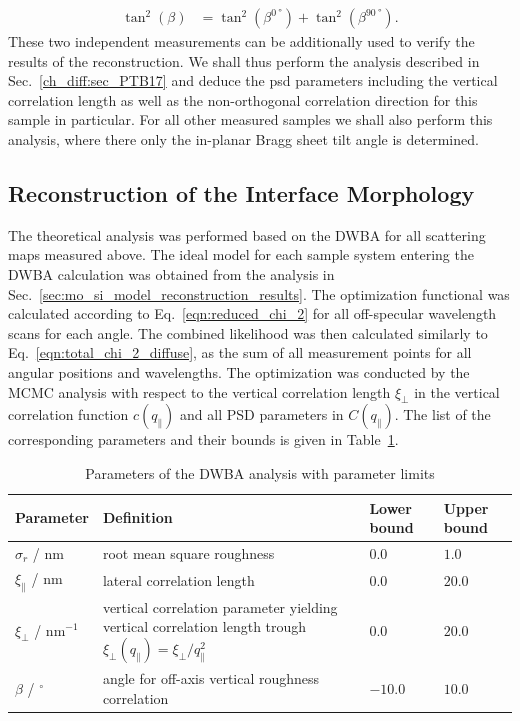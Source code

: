 \begin{align}
 \tan^2(\beta) &= \tan^2(\beta^{\SI{0}{\degree}}) + \tan^2(\beta^{\SI{90}{\degree}}) \text{.}
\end{align}
These two independent measurements can be additionally used to verify the results of the reconstruction. We shall thus perform the analysis described in Sec.~\ref{ch_diff:sec_PTB17} and deduce the \gls{psd} parameters including the vertical correlation length as well as the non-orthogonal correlation direction for this sample in particular. For all other measured samples we shall also perform this analysis, where there only the in-planar Bragg sheet tilt angle is determined.

\subsection{Reconstruction of the Interface Morphology}
The theoretical analysis was performed based on the DWBA for all scattering maps measured above. The ideal model for each sample system entering the DWBA calculation was obtained from the analysis in Sec.~\ref{sec:mo_si_model_reconstruction_results}. The optimization functional was calculated according to Eq.~\eqref{eqn:reduced_chi_2} for all off-specular wavelength scans for each angle. The combined likelihood was then calculated similarly to Eq.~\eqref{eqn:total_chi_2_diffuse}, as the sum of all measurement points for all angular positions and wavelengths. The optimization was conducted by the MCMC analysis with respect to the vertical correlation length $\xi_\perp$ in the vertical correlation function $c(q_\parallel)$ and all PSD parameters in $C(q_\parallel)$. The list of the corresponding parameters and their bounds is given in Table~\ref{tbl:diffuse_parameters}.
\begin{table}
\centering
\caption{Parameters of the DWBA analysis with parameter limits}
\label{tbl:diffuse_parameters}
\begin{tabularx}{\textwidth}{@{}lXll@{}}
\toprule
Parameter & Definition & Lower bound & Upper bound\\ \midrule
$\sigma_r$ / nm & root mean square roughness & $0.0$& $1.0$\\ 
$\xi_\parallel$ / nm & lateral correlation length & $0.0$& $20.0$\\ 
$\xi_\perp$ / nm$^{-1}$ &vertical correlation parameter yielding vertical correlation length trough $\xi_\perp(q_\parallel) = \xi_\perp/q_\parallel^2$ &$0.0$ & $20.0$\\
$\beta$ / $^\circ$&angle for off-axis vertical roughness correlation& $-10.0$ & $10.0$\\ 
 \bottomrule
\end{tabularx}
\end{table}

